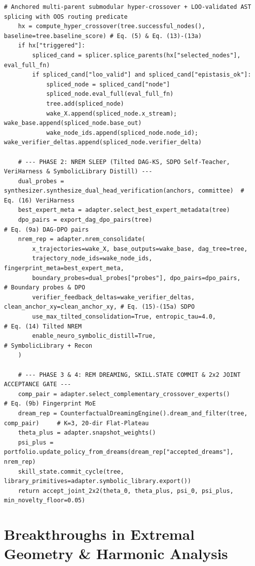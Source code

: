 \documentclass[11pt,a4paper]{article}
\begin{document}
\begin{lstlisting}[caption={Algorithm 1: \texttt{SLEEP-DAG-RSI v8} Unified Discovery \& Continual Sleep Loop.}]
    # Anchored multi-parent submodular hyper-crossover + LOO-validated AST splicing with OOS routing predicate
    hx = compute_hyper_crossover(tree.successful_nodes(), baseline=tree.baseline_score) # Eq. (5) & Eq. (13)-(13a)
    if hx["triggered"]:
        spliced_cand = splicer.splice_parents(hx["selected_nodes"], eval_full_fn)
        if spliced_cand["loo_valid"] and spliced_cand["epistasis_ok"]:
            spliced_node = spliced_cand["node"]
            spliced_node.eval_full(eval_full_fn)
            tree.add(spliced_node)
            wake_X.append(spliced_node.x_stream); wake_base.append(spliced_node.base_out)
            wake_node_ids.append(spliced_node.node_id); wake_verifier_deltas.append(spliced_node.verifier_delta)

    # --- PHASE 2: NREM SLEEP (Tilted DAG-KS, SDPO Self-Teacher, VeriHarness & SymbolicLibrary Distill) ---
    dual_probes = synthesizer.synthesize_dual_head_verification(anchors, committee)  # Eq. (16) VeriHarness
    best_expert_meta = adapter.select_best_expert_metadata(tree)
    dpo_pairs = export_dag_dpo_pairs(tree)                                           # Eq. (9a) DAG-DPO pairs
    nrem_rep = adapter.nrem_consolidate(
        x_trajectories=wake_X, base_outputs=wake_base, dag_tree=tree,
        trajectory_node_ids=wake_node_ids, fingerprint_meta=best_expert_meta,
        boundary_probes=dual_probes["probes"], dpo_pairs=dpo_pairs,                  # Boundary probes & DPO
        verifier_feedback_deltas=wake_verifier_deltas, clean_anchor_xy=clean_anchor_xy, # Eq. (15)-(15a) SDPO
        use_max_tilted_consolidation=True, entropic_tau=4.0,                         # Eq. (14) Tilted NREM
        enable_neuro_symbolic_distill=True,                                          # SymbolicLibrary + Recon
    )

    # --- PHASE 3 & 4: REM DREAMING, SKILL.STATE COMMIT & 2x2 JOINT ACCEPTANCE GATE ---
    comp_pair = adapter.select_complementary_crossover_experts()                     # Eq. (9b) Fingerprint MoE
    dream_rep = CounterfactualDreamingEngine().dream_and_filter(tree, comp_pair)     # K=3, 20-dir Flat-Plateau
    theta_plus = adapter.snapshot_weights()
    psi_plus = portfolio.update_policy_from_dreams(dream_rep["accepted_dreams"], nrem_rep)
    skill_state.commit_cycle(tree, library_primitives=adapter.symbolic_library.export())
    return accept_joint_2x2(theta_0, theta_plus, psi_0, psi_plus, min_novelty_floor=0.05)
\end{lstlisting}

\section{Breakthroughs in Extremal Geometry \& Harmonic Analysis}
\label{sec:extremal}
\end{document}
